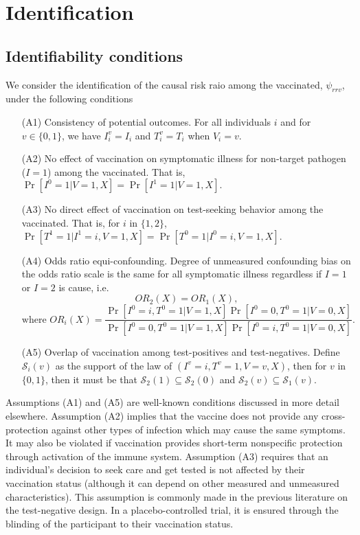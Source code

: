 \documentclass[11pt]{article}
\begin{document}
\section{Identification} \label{sec:identification}
\subsection{Identifiability conditions} \label{sec:conditions}
We consider the identification of the causal risk raio among the vaccinated, $\psi_{rrv}$, under the following conditions
\begin{itemize}
    \item[(A1)] Consistency of potential outcomes. For all individuals $i$ and for $v \in \{0, 1\}$, we have $I_i^v = I_i$ and $T_i^v = T_i$ when $V_i = v$.
    \item[(A2)] No effect of vaccination on symptomatic illness for non-target pathogen ($I = 1$) among the vaccinated. That is, $\Pr[I^0 = 1 | V = 1, X] = \Pr[I^1 = 1 | V = 1, X].$
    \item[(A3)] No direct effect of vaccination on test-seeking behavior among the vaccinated. That is, for $i$ in $\{1,2\}$, $\Pr[T^1 = 1 | I^1 = i, V = 1, X] = \Pr[T^0 = 1 | I^0 = i, V = 1, X].$
    \item[(A4)] Odds ratio equi-confounding. Degree of unmeasured confounding bias on the odds ratio scale is the same for all symptomatic illness regardless if $I=1$ or $I=2$ is cause, i.e. 
    $$OR_2(X) = OR_1(X), $$
    $$ \text{where } OR_i(X) = \frac{\Pr[I^0 = i, T^0 = 1 | V = 1, X]\Pr[I^0 = 0, T^0 = 1 | V = 0, X]}{\Pr[I^0 = 0, T^0 = 1 | V = 1, X]\Pr[I^0 = i, T^0 = 1| V = 0, X]}.$$
    \item[(A5)] Overlap of vaccination among test-positives and test-negatives. Define $\mathcal{S}_i(v)$ as the support of the law of $(I^v = i, T^v = 1, V = v, X)$, then for $v$ in $\{0,1\}$, then it must be that $\mathcal{S}_2(1) \subseteq \mathcal{S}_2(0)$ and $\mathcal{S}_2(v) \subseteq \mathcal{S}_1(v).$
   
\end{itemize}

Assumptions (A1) and (A5) are well-known conditions discussed in more detail elsewhere. Assumption (A2) implies that the vaccine does not provide any cross-protection against other types of infection which may cause the same symptoms. It may also be violated if vaccination provides short-term nonspecific protection through activation of the immune system. Assumption (A3) requires that an individual's decision to seek care and get tested is not affected by their vaccination status (although it can depend on other measured and unmeasured characteristics). This assumption is commonly made in the previous literature on the test-negative design. In a placebo-controlled trial, it is ensured through the blinding of the participant to their vaccination status. 
\end{document}
